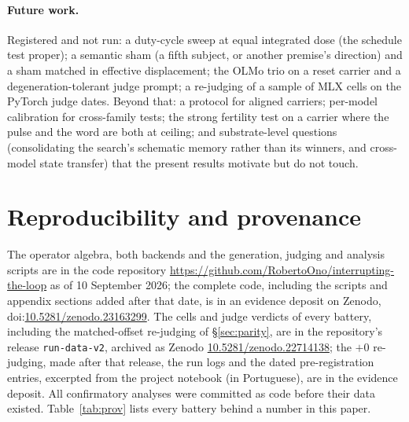 \documentclass[11pt]{article}
\newcommand{\evidencedoi}{10.5281/zenodo.23163299}
\begin{document}
\paragraph{Future work.} Registered and not run: a duty-cycle sweep
at equal integrated dose (the schedule test proper); a semantic sham
(a fifth subject, or another premise's direction) and a sham matched
in effective displacement; the OLMo trio on a reset carrier and a
degeneration-tolerant judge prompt; a re-judging of a sample of MLX
cells on the PyTorch judge dates. Beyond that: a protocol for aligned
carriers; per-model calibration for cross-family tests; the strong
fertility test on a carrier where the pulse and the word are both at
ceiling; and substrate-level questions (consolidating the search's
schematic memory rather than its winners, and cross-model state
transfer) that the present results motivate but do not touch.

\section*{Reproducibility and provenance}
The operator algebra, both backends and the generation, judging and
analysis scripts are in the code repository
\url{https://github.com/RobertoOno/interrupting-the-loop} as of 10 September
2026; the complete code, including the scripts and appendix sections added
after that date, is in an evidence deposit on Zenodo,
doi:\href{https://doi.org/\evidencedoi}{\evidencedoi}. The cells and judge
verdicts of every battery, including the matched-offset re-judging of
\S\ref{sec:parity}, are in the repository's release \texttt{run-data-v2},
archived as Zenodo
\href{https://doi.org/10.5281/zenodo.22714138}{10.5281/zenodo.22714138};
the $+0$ re-judging, made after that release, the run logs and the dated
pre-registration entries, excerpted from the project notebook (in
Portuguese), are in the evidence deposit. All confirmatory analyses were committed as code before
their data existed. Table~\ref{tab:prov} lists every battery behind a
number in this paper.
\end{document}
